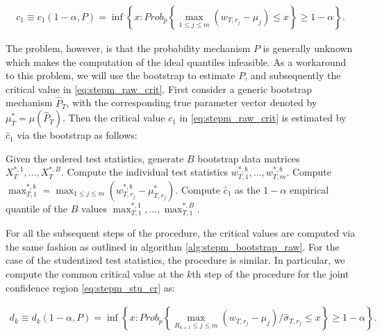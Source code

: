 \documentclass{article} %
\begin{document}
	\begin{align}
		c_1 \equiv c_1 (1 - \alpha, P) = \inf \left\{ x : Prob_p \left\{ \max_{1 \leq j \leq m} (w_{T,r_j} - \mu_j) \leq x \right\} \geq 1 - \alpha \right\}. \label{eq:stepm_raw_crit}
	\end{align}
	
	
	The problem, however, is that the probability mechanism $P$ is generally unknown which makes the computation of the ideal quantiles infeasible. As a workaround to this problem, we will use the bootstrap to estimate $P$, and subsequently the critical value in \eqref{eq:stepm_raw_crit}. First consider a generic bootstrap mechanism $\hat{P}_T$, with the corresponding true parameter vector denoted by $\mu_T^* = \mu(\hat{P}_T)$. Then the critical value $c_1$ in \eqref{eq:stepm_raw_crit} is estimated by $\hat{c}_1$ via the bootstrap as follows:
	
	\begin{algorithm}
		\caption{Computation of the Critical Values for The StepM Procedure via The Bootstrap}
		\label{alg:stepm_bootstrap_raw}
		\begin{algorithmic}[1]
			\State Given the ordered test statistics, generate $B$ bootstrap data matrices $X_T^{*,1}, \dots , X_T^{*,B}$.
			\State Compute the individual test statistics $w_{T,1}^{*,b}, \dots, w_{T,m}^{*,b}$.
			\EndFor
			\State Compute $\max_{T,1}^{*,b} = \max_{1 \leq j \leq m} (w_{T,r_j}^{*,b} - \mu_{T,r_j}^*)$.
			\EndFor
			\State Compute $\hat{c}_1$ as the $1 - \alpha$ empirical quantile of the $B$ values $\max_{T,1}^{*,1}, \dots, \max_{T,1}^{*,B}$.
		\end{algorithmic}
	\end{algorithm}
	
	For all the subsequent steps of the procedure, the critical values are computed via the same fashion as outlined in algorithm \ref{alg:stepm_bootstrap_raw}. For the case of the studentized test statistics, the procedure is similar. In particular, we compute the common critical value at the $k$th step of the procedure for the joint confidence region \eqref{eq:stepm_stu_cr} as:
	
	\begin{align}
		d_k \equiv d_k (1 - \alpha, P) = \inf \left\{ x : Prob_p \left\{ \max_{R_{k+1} \leq j \leq m} (w_{T,r_j} - \mu_j)/\hat{\sigma}_{T,r_j} \leq x \right\} \geq 1 - \alpha \right\}. 	\label{eq:stepm_stu_crit}
	\end{align}	
	
\end{document}
